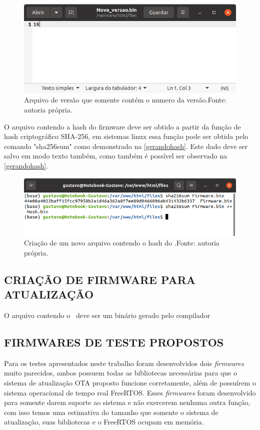\begin{figure}[H]
    \scriptsize
     \centering
     \includegraphics[scale=0.9]{dados/figuras/arquivodeversao.png}
     \caption{Arquivo de versão que somente contém o numero da versão.\newline Fonte: autoria própria.}
     \label{arquivoversao}
\end{figure}

O arquivo contendo a hash do firmware deve ser obtido a partir da função de hash criptográfico SHA-256, em sistemas linux essa função pode ser obtida pelo comando "sha256sum" como demonstrado na \autoref{gerandohash}. Este dado deve ser salvo em modo texto também, como também é possível ser observado na \autoref{gerandohash}.

\begin{figure}[H]
    \scriptsize
     \centering
     \includegraphics[scale=0.8]{dados/figuras/hashcreate.png}
     \caption{Criação de um novo arquivo contendo o hash do \firmware.\newline Fonte: autoria própria.}
     \label{gerandohash}
\end{figure}
\subsection{CRIAÇÃO DE FIRMWARE PARA ATUALIZAÇÃO}
O arquivo contendo o \firmware\ deve ser um binário gerado pelo compilador 

\subsection {FIRMWARES DE TESTE PROPOSTOS}
Para os testes apresentados neste trabalho foram desenvolvidos dois \textit{firmwares} muito parecidos, ambos possuem todas as bibliotecas necessárias para que o sistema de atualização OTA proposto funcione corretamente, além de possuírem o sistema operacional de tempo real FreeRTOS. Esses \textit{firmwares} foram desenvolvido para somente darem suporte ao sistema e não exercerem nenhuma outra função, com isso temos uma estimativa do tamanho que somente o sistema de atualização, suas bibliotecas e o FreeRTOS ocupam em memória.


